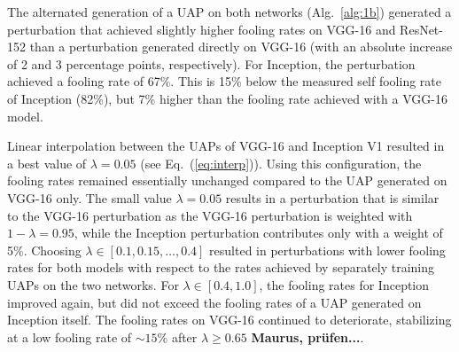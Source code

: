 \documentclass[runningheads]{llncs}
\begin{document}
The alternated generation of a UAP on both networks (Alg.~\ref{alg:1b}) generated a perturbation that achieved slightly higher fooling rates on VGG-16 and ResNet-152 than a perturbation generated directly on VGG-16 (with an absolute increase of 2 and 3 percentage points, respectively). For Inception, the perturbation achieved a fooling rate of 67\%. This is 15\% below the measured self fooling rate of Inception (82\%), but 7\% higher than the fooling rate achieved with a VGG-16 model. 

Linear interpolation between the UAPs of VGG-16 and Inception V1 resulted in a best value of \(\lambda=0.05\) (see Eq.~(\ref{eq:interp})). Using this configuration, the fooling rates remained essentially unchanged compared to the UAP generated on VGG-16 only.
The small value \(\lambda=0.05\) results in a perturbation that is similar to the VGG-16 perturbation as the VGG-16 perturbation is weighted with \(1-\lambda=0.95\), while the Inception perturbation contributes only with a weight of 5\%. Choosing \(\lambda\in\left[0.1,0.15,\ldots,0.4\right]\) resulted in perturbations with lower fooling rates for both models with respect to the rates achieved by separately training UAPs on the two networks. For \(\lambda \in\left[0.4,1.0\right]\), the fooling rates for Inception improved again, but did not exceed the fooling rates of a UAP generated on Inception itself. The fooling rates on VGG-16 continued to deteriorate, stabilizing at a low fooling rate of \(\sim 15\%\) after \(\lambda\geq 0.65\) {\bf Maurus, prüfen...}.
\end{document}
